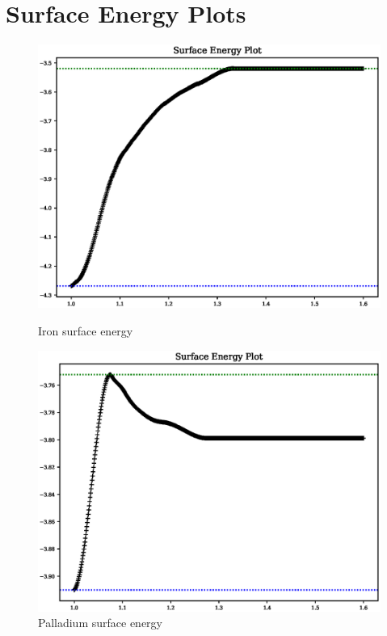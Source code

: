 \FloatBarrier
\section{Surface Energy Plots}
\label{section:fepdv2se}

\begin{figure}[ht] 
  \begin{minipage}[b]{0.4\linewidth}
    \centering
    \includegraphics[width=.9\linewidth]{chapters/results_potential_fitting/pot_fepd_fcc_2/fe_surface_energy.eps} 
    \caption{Iron surface energy}  
    \label{fig:fev2surface}
  \end{minipage}%
  \begin{minipage}[b]{0.4\linewidth}
    \centering
    \includegraphics[width=.9\linewidth]{chapters/results_potential_fitting/pot_fepd_fcc_2/pd_surface_energy.eps} 
    \caption{Palladium surface energy}  
    \label{fig:pdv2surface}
  \end{minipage}%
\end{figure}



